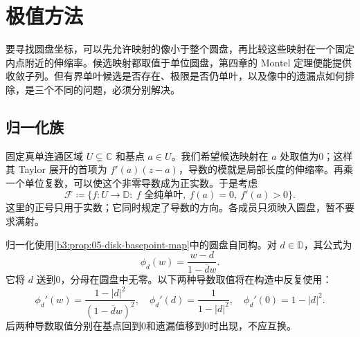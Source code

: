 \section{极值方法}
\label{b3:sec:0502}

要寻找圆盘坐标，可以先允许映射的像小于整个圆盘，再比较这些映射在一个固定内点附近的伸缩率。候选映射都取值于单位圆盘，第四章的 Montel 定理便能提供收敛子列。但有界单叶候选是否存在、极限是否仍单叶，以及像中的遗漏点如何排除，是三个不同的问题，必须分别解决。

\subsection{归一化族}
\label{b3:subsec:050201}

固定真单连通区域 \(U\subsetneq\mathbb C\) 和基点 \(a\in U\)。我们希望候选映射在 \(a\) 处取值为0；这样其 Taylor 展开的首项为 \(f'(a)(z-a)\)，导数的模就是局部长度的伸缩率。再乘一个单位复数，可以使这个非零导数成为正实数。于是考虑
\[
 \mathcal F\coloneqq
 \{f:U\to\mathbb D:\ f\text{ 全纯单叶},\
 f(a)=0,\ f'(a)>0\}.
\]
这里的正号只用于实数；它同时规定了导数的方向。各成员只须映入圆盘，暂不要求满射。

\ProseParagraphBreak

归一化使用\cref{b3:prop:05-disk-basepoint-map}中的圆盘自同构。对 \(d\in\mathbb D\)，其公式为
\[
 \phi_d(w)=\frac{w-d}{1-\overline d w}.
\]
它将 \(d\) 送到0，分母在圆盘中无零。以下两种导数取值将在构造中反复使用：
\begin{equation}\label{b3:eq:05-disk-normalization}
 \phi_d'(w)=\frac{1-|d|^2}{(1-\overline d w)^2},
 \quad
 \phi_d'(d)=\frac1{1-|d|^2},
 \quad
 \phi_d'(0)=1-|d|^2.
\end{equation}
后两种导数取值分别在基点回到0和遗漏值移到0时出现，不应互换。

